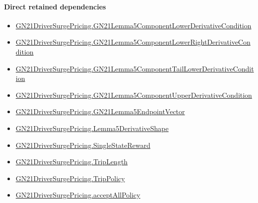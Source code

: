 \documentclass[10pt]{article}
\begin{document}
\paragraph{Direct retained dependencies}
\begin{itemize}\raggedright
\item \hyperlink{governing-declaration-23f1c3dda255e9fa}{GN21\allowbreak{}Driver\allowbreak{}Surge\allowbreak{}Pricing.\allowbreak{}GN21\allowbreak{}Lemma5\allowbreak{}Component\allowbreak{}Lower\allowbreak{}Derivative\allowbreak{}Condition}
\item \hyperlink{governing-declaration-d79ce10a6d1195d3}{GN21\allowbreak{}Driver\allowbreak{}Surge\allowbreak{}Pricing.\allowbreak{}GN21\allowbreak{}Lemma5\allowbreak{}Component\allowbreak{}Lower\allowbreak{}Right\allowbreak{}Derivative\allowbreak{}Condition}
\item \hyperlink{governing-declaration-d12b637e898ed436}{GN21\allowbreak{}Driver\allowbreak{}Surge\allowbreak{}Pricing.\allowbreak{}GN21\allowbreak{}Lemma5\allowbreak{}Component\allowbreak{}Tail\allowbreak{}Lower\allowbreak{}Derivative\allowbreak{}Condition}
\item \hyperlink{governing-declaration-f4c3e8ee2ad8ae6b}{GN21\allowbreak{}Driver\allowbreak{}Surge\allowbreak{}Pricing.\allowbreak{}GN21\allowbreak{}Lemma5\allowbreak{}Component\allowbreak{}Upper\allowbreak{}Derivative\allowbreak{}Condition}
\item \hyperlink{governing-declaration-f1329aeb3f4d2e32}{GN21\allowbreak{}Driver\allowbreak{}Surge\allowbreak{}Pricing.\allowbreak{}GN21\allowbreak{}Lemma5\allowbreak{}Endpoint\allowbreak{}Vector}
\item \hyperlink{paper-prerequisite-bdf8218f91905191}{GN21\allowbreak{}Driver\allowbreak{}Surge\allowbreak{}Pricing.\allowbreak{}Lemma5\allowbreak{}Derivative\allowbreak{}Shape}
\item \hyperlink{governing-declaration-f7708ce48623a5e0}{GN21\allowbreak{}Driver\allowbreak{}Surge\allowbreak{}Pricing.\allowbreak{}Single\allowbreak{}State\allowbreak{}Reward}
\item \hyperlink{governing-declaration-a616c143f22cf2bc}{GN21\allowbreak{}Driver\allowbreak{}Surge\allowbreak{}Pricing.\allowbreak{}Trip\allowbreak{}Length}
\item \hyperlink{governing-declaration-4312ad4cb899871f}{GN21\allowbreak{}Driver\allowbreak{}Surge\allowbreak{}Pricing.\allowbreak{}Trip\allowbreak{}Policy}
\item \hyperlink{governing-declaration-e94c9281d4f4b12d}{GN21\allowbreak{}Driver\allowbreak{}Surge\allowbreak{}Pricing.\allowbreak{}accept\allowbreak{}All\allowbreak{}Policy}

\end{itemize}
\end{document}
